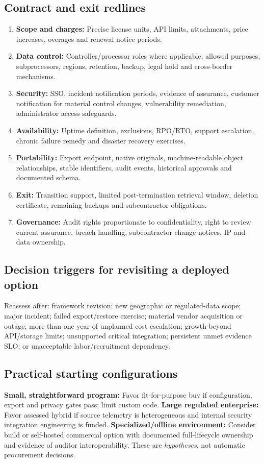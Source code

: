 \documentclass[10pt,letterpaper]{article}
\begin{document}
\subsection{Contract and exit redlines}
\begin{enumerate}
\item \textbf{Scope and charges:} Precise license units, API limits, attachments, price increases, overages and renewal notice periods.
\item \textbf{Data control:} Controller/processor roles where applicable, allowed purposes, subprocessors, regions, retention, backup, legal hold and cross-border mechanisms.
\item \textbf{Security:} SSO, incident notification periods, evidence of assurance, customer notification for material control changes, vulnerability remediation, administrator access safeguards.
\item \textbf{Availability:} Uptime definition, exclusions, RPO/RTO, support escalation, chronic failure remedy and disaster recovery exercises.
\item \textbf{Portability:} Export endpoint, native originals, machine-readable object relationships, stable identifiers, audit events, historical approvals and documented schema.
\item \textbf{Exit:} Transition support, limited post-termination retrieval window, deletion certificate, remaining backups and subcontractor obligations.
\item \textbf{Governance:} Audit rights proportionate to confidentiality, right to review current assurance, breach handling, subcontractor change notices, IP and data ownership.
\end{enumerate}

\subsection{Decision triggers for revisiting a deployed option}
Reassess after: framework revision; new geographic or regulated-data scope; major incident; failed export/restore exercise; material vendor acquisition or outage; more than one year of unplanned cost escalation; growth beyond API/storage limits; unsupported critical integration; persistent unmet evidence SLO; or unacceptable labor/recruitment dependency.

\subsection{Practical starting configurations}
\textbf{Small, straightforward program:} Favor fit-for-purpose buy if configuration, export and privacy gates pass; limit custom code. \textbf{Large regulated enterprise:} Favor assessed hybrid if source telemetry is heterogeneous and internal security integration engineering is funded. \textbf{Specialized/offline environment:} Consider build or self-hosted commercial option with documented full-lifecycle ownership and evidence of auditor interoperability. These are \emph{hypotheses}, not automatic procurement decisions.
\end{document}
